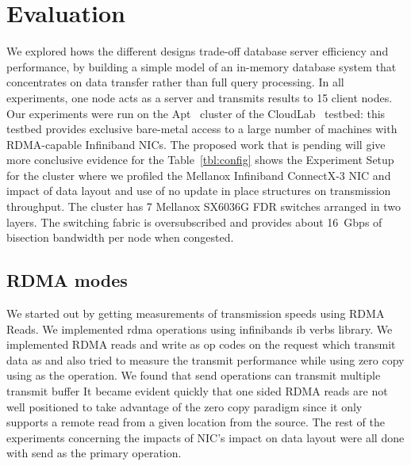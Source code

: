 
\chapter{Evaluation}




We explored hows the different designs trade-off database server efficiency and
performance, by building a simple model of an in-memory database system that
concentrates on data transfer rather than full query processing. In all experiments,
one node acts as a server and transmits results to 15 client nodes.
Our experiments were run on the Apt~\cite{Ricci+:OSR15} cluster of the
CloudLab~\cite{Cloudlab:URL} testbed: this testbed provides exclusive bare-metal
access to a large number of machines with RDMA-capable Infiniband NICs.
The proposed work that is pending will give more conclusive evidence for the 
Table~\ref{tbl:config} shows the Experiment Setup for the cluster where we profiled
the Mellanox Infiniband ConnectX-3 \textregistered NIC and impact of data layout and 
use of no update in place structures on transmission throughput. The cluster has 7
Mellanox SX6036G FDR switches arranged in two layers. The switching fabric is
oversubscribed and provides about 16~Gbps of bisection bandwidth per node
when congested.





\section{RDMA modes}
We started out by getting measurements of transmission speeds using RDMA Reads.
We implemented rdma operations using infinibands ib verbs library. We implemented 
RDMA reads and write as op codes on the  request which 
transmit data as  and also tried to measure the transmit
performance while using zero copy using  as the operation.
We found that send operations can transmit multiple transmit buffer
It became evident quickly that one sided RDMA reads are not well positioned to 
take advantage of the zero copy paradigm since it only supports a remote read 
from a given location from the source. The rest of the experiments concerning
the impacts of NIC's impact on data layout were all done with send as the primary
operation. 


